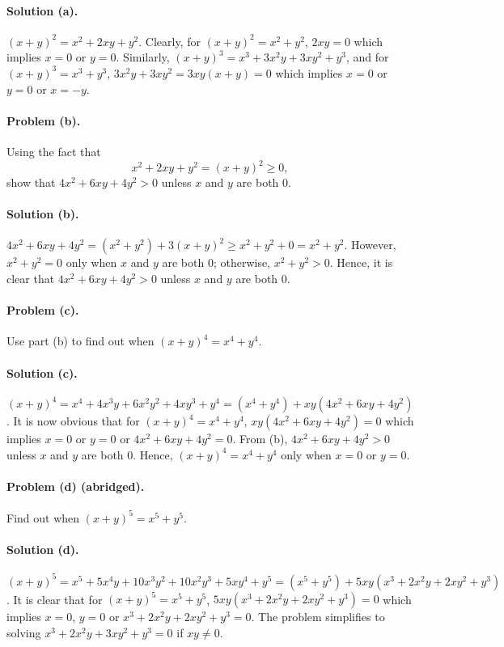 \documentclass{article}
\begin{document}
\paragraph{Solution (a).} $(x + y)^2 = x^2 + 2xy + y^2$. Clearly, for
$(x + y)^2 = x^2 + y^2$, $2xy = 0$ which implies $x = 0$ or $y = 0$. Similarly,
$(x + y)^3 = x^3 + 3x^2y + 3xy^2 + y^3$, and for $(x + y)^3 = x^3 + y^3$,
$3x^2y + 3xy^2 = 3xy(x + y) = 0$ which implies $x = 0$ or $y = 0$ or $x = -y$.

\paragraph{Problem (b).} Using the fact that \begin{equation*}
  x^2 + 2xy + y^2 = (x + y)^2 \geq 0,
\end{equation*} show that $4x^2 + 6xy + 4y^2 > 0$ unless $x$ and $y$ are both
0.

\paragraph{Solution (b).} $4x^2 + 6xy + 4y^2 = (x^2 + y^2) + 3(x + y)^2 \geq
x^2 + y^2 + 0 = x^2 + y^2$. However, $x^2 + y^2 = 0$ only when $x$ and $y$ are
both 0; otherwise, $x^2 + y^2 > 0$.  Hence, it is clear that $4x^2 + 6xy + 4y^2
> 0$ unless $x$ and $y$ are both 0.

\paragraph{Problem (c).} Use part (b) to find out when $(x + y)^4 = x^4 + y^4$.

\paragraph{Solution (c).} $(x + y)^4 = x^4 + 4x^3y + 6x^2y^2 + 4xy^3 + y^4 =
(x^4 + y^4) + xy(4x^2 + 6xy + 4y^2)$. It is now obvious that for $(x + y)^4 =
x^4 + y^4$, $xy(4x^2 + 6xy + 4y^2) = 0$ which implies $x = 0$ or $y = 0$ or
$4x^2 + 6xy + 4y^2 = 0$. From (b), $4x^2 + 6xy + 4y^2 > 0$ unless $x$ and $y$
are both 0. Hence, $(x + y)^4 = x^4 + y^4$ only when $x = 0$ or $y = 0$.

\paragraph{Problem (d) (abridged).} Find out when $(x + y)^5 = x^5 + y^5$.

\paragraph{Solution (d).} $(x + y)^5 = x^5 + 5x^4y + 10x^3y^2 + 10x^2y^3 +
5xy^4 + y^5 = (x^5 + y^5) + 5xy(x^3 + 2x^2y + 2xy^2 + y^3)$. It is clear that
for $(x + y)^5 = x^5 + y^5$, $5xy(x^3 + 2x^2y + 2xy^2 + y^3) = 0$ which implies
$x = 0$, $y = 0$ or $x^3 + 2x^2y + 2xy^2 + y^3 = 0$. The problem simplifies to
solving $x^3 + 2x^2y + 3xy^2 + y^3 = 0$ if $xy \neq 0$.
\end{document}
